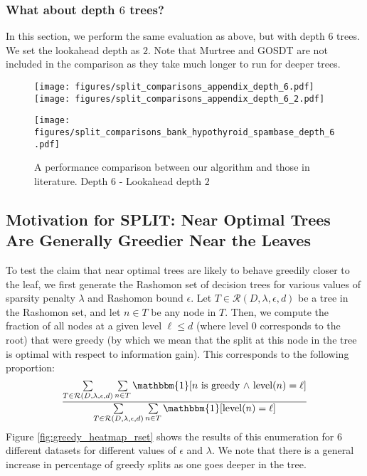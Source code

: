 \subsubsection{What about depth $6$ trees?}
In this section, we perform the same evaluation as above, but with depth $6$ trees. We set the lookahead depth as $2$. Note that Murtree and GOSDT are not included in the comparison as they take much longer to run for deeper trees.
\begin{figure}[H]
    \centering
    \texttt{[image: figures/split\_comparisons\_appendix\_depth\_6.pdf]}
    \texttt{[image: figures/split\_comparisons\_appendix\_depth\_6\_2.pdf]}
\end{figure}
\begin{figure}[H]
    \centering
    \texttt{[image: figures/split\_comparisons\_bank\_hypothyroid\_spambase\_depth\_6.pdf]}
    \caption{A performance comparison between our algorithm and those in literature. Depth $6$ - Lookahead depth $2$}
    \label{fig:split_comparisons_appendix_depth_6}
\end{figure}
\subsection{Motivation for SPLIT: Near Optimal Trees Are Generally Greedier Near the Leaves}
 To test the claim that near optimal trees are likely to behave greedily closer to the leaf, we first generate the Rashomon set of decision trees \citep{xin2022treefarms} for various values of sparsity penalty $\lambda$ and Rashomon bound $\epsilon$.  Let $T \in \mathcal{R}(D, \lambda, \epsilon, d)$ be a tree in the Rashomon set, and let $n \in T$ be any node in $T$. Then, we compute the fraction of all nodes at a given level $\ell \leq d$ (where level $0$ corresponds to the root) that were greedy (by which we mean that the split at this node in the tree is optimal with respect to information gain). This corresponds to the following proportion:
{
\begin{equation}
\label{eq:rset_ratio}
\frac{\sum\limits_{T\in \mcR(D, \lambda, \epsilon, d)} \sum\limits_{\textrm{$n$} \in T }\mathbbm{1}[\textrm{$n$ is greedy $\land$ level$(n) = \ell$}]}{\sum\limits_{T \in \mcR(D, \lambda, \epsilon, d)} \sum\limits_{\textrm{$n$} \in T }\mathbbm{1}[\textrm{level}(n) = \ell]}
\end{equation}
}
Figure \ref{fig:greedy_heatmap_rset} shows the results of this enumeration for $6$ different datasets for different values of $\epsilon$ and $\lambda$. We note that there is a general increase in percentage of greedy splits as one goes deeper in the tree. 

